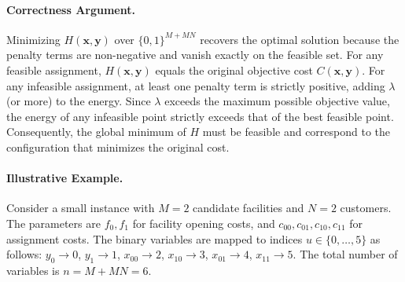 \documentclass[12pt]{article}
\begin{document}
\paragraph{Correctness Argument.}
Minimizing $H(\mathbf{x},\mathbf{y})$ over $\{0,1\}^{M+MN}$ recovers the optimal solution because the penalty terms are non-negative and vanish exactly on the feasible set. For any feasible assignment, $H(\mathbf{x},\mathbf{y})$ equals the original objective cost $C(\mathbf{x},\mathbf{y})$. For any infeasible assignment, at least one penalty term is strictly positive, adding $\lambda$ (or more) to the energy. Since $\lambda$ exceeds the maximum possible objective value, the energy of any infeasible point strictly exceeds that of the best feasible point. Consequently, the global minimum of $H$ must be feasible and correspond to the configuration that minimizes the original cost.

\paragraph{Illustrative Example.}
Consider a small instance with $M=2$ candidate facilities and $N=2$ customers. The parameters are $f_0, f_1$ for facility opening costs, and $c_{00}, c_{01}, c_{10}, c_{11}$ for assignment costs. The binary variables are mapped to indices $u \in \{0,\dots,5\}$ as follows: $y_0 \to 0$, $y_1 \to 1$, $x_{00} \to 2$, $x_{10} \to 3$, $x_{01} \to 4$, $x_{11} \to 5$. The total number of variables is $n = M + MN = 6$.
\end{document}
